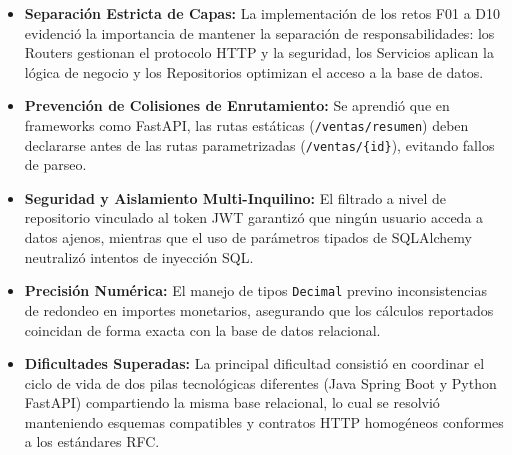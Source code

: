 \documentclass[11pt,a4paper]{article}
\begin{document}
\begin{itemize}
    \item \textbf{Separación Estricta de Capas:} La implementación de los retos F01 a D10 evidenció la importancia de mantener la separación de responsabilidades: los Routers gestionan el protocolo HTTP y la seguridad, los Servicios aplican la lógica de negocio y los Repositorios optimizan el acceso a la base de datos.
    \item \textbf{Prevención de Colisiones de Enrutamiento:} Se aprendió que en frameworks como FastAPI, las rutas estáticas (\texttt{/ventas/resumen}) deben declararse antes de las rutas parametrizadas (\texttt{/ventas/\{id\}}), evitando fallos de parseo.
    \item \textbf{Seguridad y Aislamiento Multi-Inquilino:} El filtrado a nivel de repositorio vinculado al token JWT garantizó que ningún usuario acceda a datos ajenos, mientras que el uso de parámetros tipados de SQLAlchemy neutralizó intentos de inyección SQL.
    \item \textbf{Precisión Numérica:} El manejo de tipos \texttt{Decimal} previno inconsistencias de redondeo en importes monetarios, asegurando que los cálculos reportados coincidan de forma exacta con la base de datos relacional.
    \item \textbf{Dificultades Superadas:} La principal dificultad consistió en coordinar el ciclo de vida de dos pilas tecnológicas diferentes (Java Spring Boot y Python FastAPI) compartiendo la misma base relacional, lo cual se resolvió manteniendo esquemas compatibles y contratos HTTP homogéneos conformes a los estándares RFC.
\end{itemize}
\end{document}
